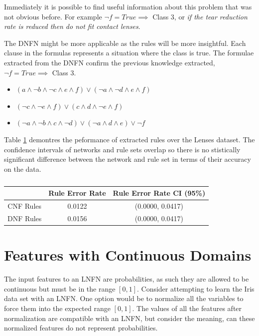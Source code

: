 Immediately it is possible to find useful information about this problem that was not obvious before. For example $\lnot f = True \implies $ Class 3, or \textit{if the tear reduction rate is reduced then do not fit contact lenses}.



The DNFN might be more applicable as the rules will be more insightful. Each clause in the formulas represents a situation where the class is true. The formulae extracted from the DNFN confirm the previous knowledge extracted, $\lnot f = True \implies $ Class 3.

\begin{itemize}
	\item {} $(a \land \lnot b \land \lnot c \land e \land f) \lor (\lnot a \land \lnot d \land e \land f)$
	\item {} $(\lnot c \land \lnot e \land f) \lor (c \land d \land \lnot e \land f)$
	\item {} $(\lnot a \land \lnot b \land c \land \lnot d) \lor (\lnot a \land d \land e) \lor \lnot f$
\end{itemize}

Table \ref{tab:lenses-rule-peformance-comp} demontres the peformance of extracted rules over the Lenses dataset. The confidence intervals of networks and rule sets overlap so there is no stistically significant difference between the network and rule set in terms of their accuracy on the data.

\begin{table}[H]
	\begin{center}
		\begin{tabular}{| c | c | c |}
			\hline
			& Rule Error Rate & Rule Error Rate CI (95\%) \\
			\hline
			\hline
			CNF Rules & 0.0122 & (0.0000, 0.0417) \\
			\hline
			DNF Rules & 0.0156 & (0.0000, 0.0417) \\
			\hline
		\end{tabular}
	\end{center}
	\caption{}
	\label{tab:lenses-rule-peformance-comp}
\end{table}

\section{Features with Continuous Domains}
The input features to an LNFN are probabilities, as such they are allowed to be continuous but must be in the range $[0, 1]$. Consider attempting to learn the Iris data set \cite{Lichman:2013} with an LNFN. One option would be to normalize all the variables to force them into the expected range $[0,1]$. The values of all the features after normalization are compatible with an LNFN, but consider the meaning, can these normalized features do not represent probabilities.\\

